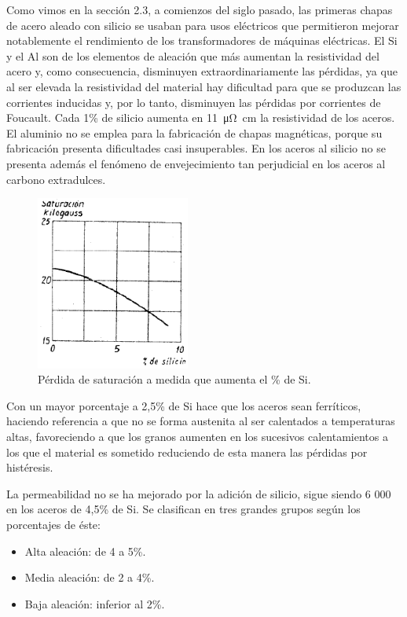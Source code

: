 \documentclass[12pt,a4paper]{article}
\begin{document}
Como vimos en la sección 2.3, a comienzos del siglo pasado, las primeras chapas de acero aleado con silicio se usaban para usos eléctricos que permitieron mejorar notablemente el rendimiento de los transformadores de máquinas eléctricas. El Si y el Al son de los elementos de aleación que más aumentan la resistividad del acero y, como consecuencia, disminuyen extraordinariamente las pérdidas, ya que al ser elevada la resistividad del material hay dificultad para que se produzcan las corrientes inducidas y, por lo tanto, disminuyen las pérdidas por corrientes de Foucault. Cada 1\% de silicio aumenta en \SI{11}{\micro\ohm\centi\metre} la resistividad de los aceros. El aluminio no se emplea para la fabricación de chapas magnéticas, porque su fabricación presenta dificultades casi insuperables. En los aceros al silicio no se presenta además el fenómeno de envejecimiento tan perjudicial en los aceros al carbono extradulces.

\begin{figure}[h!]
    \centering
    \includegraphics[width=0.45\textwidth]{IMAGENES LATEX/silicio.png}
    \caption{Pérdida de saturación a medida que aumenta el \% de Si.}
    \label{fig:silicio}
\end{figure}

Con un mayor porcentaje a 2,5\% de Si hace que los aceros sean ferríticos, haciendo referencia a que no se forma austenita al ser calentados a temperaturas altas, favoreciendo a que los granos aumenten en los sucesivos calentamientos a los que el material es sometido reduciendo de esta manera las pérdidas por histéresis.

La permeabilidad no se ha mejorado por la adición de silicio, sigue siendo 6 000 en los aceros de 4,5\% de Si. Se clasifican en tres grandes grupos según los porcentajes de éste: 

\begin{itemize}
    \item Alta aleación: de 4 a 5\%.
    \item Media aleación: de 2 a 4\%.
    \item Baja aleación: inferior al 2\%.
\end{itemize}
\end{document}
